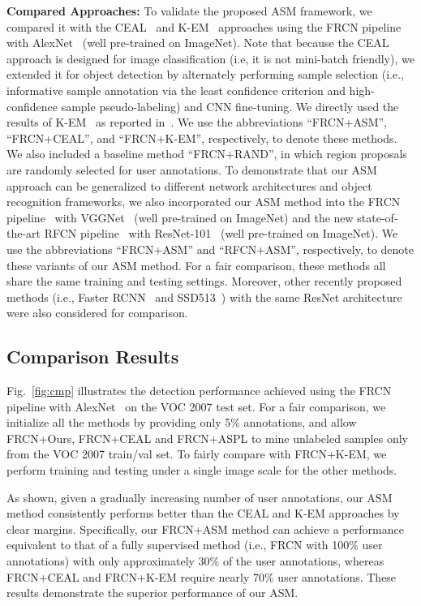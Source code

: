 \documentclass[journal]{IEEEtran}
\begin{document}
{\textbf{Compared Approaches:} 
To validate the proposed {ASM} framework, we compared it with the CEAL~\cite{ceal16tcsvt} and K-EM~\cite{em17} approaches using the FRCN pipeline with AlexNet~\cite{alexnet12NIPS} (well pre-trained on ImageNet). Note that because the CEAL approach is designed for image classification (i.e, it is not mini-batch friendly), we extended it for object detection by alternately performing sample selection (i.e., informative sample annotation via the least confidence criterion and high-confidence sample pseudo-labeling) and CNN fine-tuning. We directly used the results of K-EM~\cite{em17} as reported in~\cite{em17}. We use the abbreviations ``FRCN+{ASM}'', ``FRCN+CEAL'', and ``FRCN+K-EM'', respectively, to denote these methods. We also included a baseline method ``FRCN+RAND'', in which region proposals are randomly selected for user annotations. To demonstrate that our {ASM} approach can be generalized to different network architectures and object recognition frameworks, we {also} incorporated our {ASM} method into the FRCN pipeline~\cite{frcn} with VGGNet~\cite{vgg} (well pre-trained on ImageNet) and the new state-of-the-art RFCN pipeline~\cite{rfcn16NIPS} with ResNet-101~\cite{He_2016_CVPR} (well pre-trained on ImageNet). We use the abbreviations ``FRCN+{ASM}'' and ``RFCN+{ASM}'', respectively, to denote these variants of our {ASM} method. {For a fair comparison, these methods all share the same training and testing settings.} Moreover, other recently proposed methods (i.e., Faster RCNN~\cite{ren2015faster} and SSD513~\cite{ssd16ECCV}) with the same ResNet architecture were also considered for comparison.


\subsection{Comparison Results}

Fig.~\ref{fig:cmp} illustrates the detection performance achieved using the FRCN pipeline with AlexNet~\cite{alexnet12NIPS} on the VOC 2007 test set. For a fair comparison, we initialize all the methods by providing only 5\% annotations, and allow FRCN+Ours, FRCN+CEAL and FRCN+ASPL to mine unlabeled samples only from the VOC 2007 train/val set. To fairly compare with FRCN+K-EM, we perform training and testing under a single image scale for the other methods. 

As shown, given a gradually increasing number of user annotations, our {ASM} method consistently performs better than the CEAL and K-EM approaches by clear margins. Specifically, our FRCN+{ASM} method can achieve a performance equivalent to that of a fully supervised method (i.e., FRCN with 100\% user annotations) with only approximately 30\% of the user annotations, whereas FRCN+CEAL and FRCN+K-EM require nearly 70\% user annotations. These results demonstrate the superior performance of our ASM.



}
\end{document}
